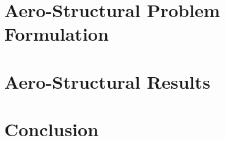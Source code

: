 \documentclass[]{aiaa-tc} %
\begin{document}
  \section{Aero-Structural Problem Formulation}

  \section{Aero-Structural Results}

  \section{Conclusion}

  
\end{document}
